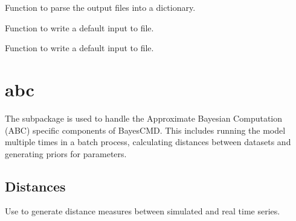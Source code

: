 \documentclass[letterpaper,10pt,english]{sphinxmanual}
\begin{document}
\begin{fulllineitems}

\begin{fulllineitems}
\label{\detokenize{bcmdModel:bayescmd.bcmdModel.ModelBCMD.output_parse}}
Function to parse the output files into a dictionary.

\end{fulllineitems}


\begin{fulllineitems}
\label{\detokenize{bcmdModel:bayescmd.bcmdModel.ModelBCMD.write_default_input}}
Function to write a default input to file.

\end{fulllineitems}


\begin{fulllineitems}
\label{\detokenize{bcmdModel:bayescmd.bcmdModel.ModelBCMD.write_initialised_input}}
Function to write a default input to file.

\end{fulllineitems}


\end{fulllineitems}



\chapter{abc}
\label{\detokenize{abc::doc}}\label{\detokenize{abc:abc}}
The  subpackage is used to handle the Approximate Bayesian Computation
(ABC) specific components of BayesCMD. This includes running the model multiple
times in a batch process, calculating distances between datasets and generating
priors for parameters.
\label{\detokenize{abc:module-bayescmd.abc}}

\section{Distances}
\label{\detokenize{abc:module-bayescmd.abc.distances}}\label{\detokenize{abc:distances}}
Use to generate distance measures between simulated and real time series.
\end{document}
